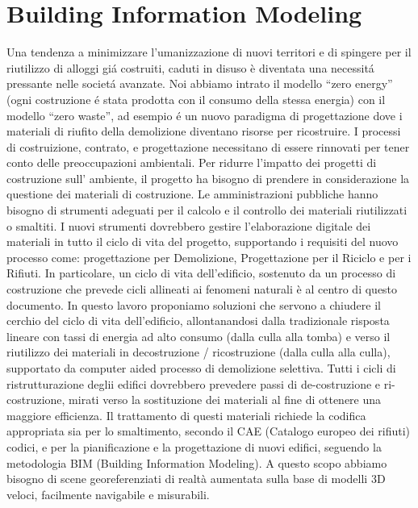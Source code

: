 \section{Building Information Modeling}
\label{sec:chapter_1_section_1}
\noindent

Una tendenza a minimizzare l'umanizzazione di nuovi territori e di spingere per il riutilizzo di alloggi
gi\'a costruiti, caduti in disuso \`e diventata una necessit\'a pressante nelle societ\'a avanzate.
Noi abbiamo intrato il modello ``zero energy'' (ogni costruzione \'e stata prodotta con il consumo della stessa energia)
con il modello ``zero waste'', ad esempio \'e un nuovo paradigma di progettazione dove i materiali di riufito della demolizione
diventano risorse per ricostruire\cite{altamura:12}.
I processi di costruizione, contrato, e progettazione necessitano di essere rinnovati per tener conto delle preoccupazioni
ambientali. Per ridurre l'impatto dei progetti di costruzione sull' ambiente, il progetto ha bisogno di prendere in
considerazione la questione dei materiali di costruzione.
Le amministrazioni pubbliche hanno bisogno di strumenti adeguati per il calcolo e il controllo dei materiali riutilizzati o smaltiti.
I nuovi strumenti dovrebbero gestire l'elaborazione digitale dei materiali in tutto il ciclo di vita del progetto,
supportando i requisiti del nuovo processo come: progettazione per Demolizione, Progettazione per il Riciclo e per i Rifiuti.
In particolare, un ciclo di vita dell'edificio, sostenuto da un processo di costruzione che prevede cicli allineati
ai fenomeni naturali è al centro di questo documento.
In questo lavoro proponiamo soluzioni che servono a chiudere il cerchio del ciclo di vita dell'edificio, allontanandosi
dalla tradizionale risposta lineare con tassi di energia ad alto consumo (dalla culla alla tomba) e verso il riutilizzo
dei materiali in decostruzione / ricostruzione (dalla culla alla culla),
supportato da computer aided processo di demolizione selettiva.
Tutti i cicli di ristrutturazione deglii edifici dovrebbero prevedere passi di de-costruzione e ri-costruzione, mirati
verso la sostituzione dei materiali al fine di ottenere una maggiore efficienza. Il trattamento di questi materiali
richiede la codifica appropriata sia per lo smaltimento, secondo il CAE (Catalogo europeo dei rifiuti) codici,
e per la pianificazione e la progettazione di nuovi edifici, seguendo la metodologia BIM (Building Information Modeling).
A questo scopo abbiamo bisogno di scene georeferenziati di realtà aumentata sulla base di modelli 3D veloci,
facilmente navigabile e misurabili.
